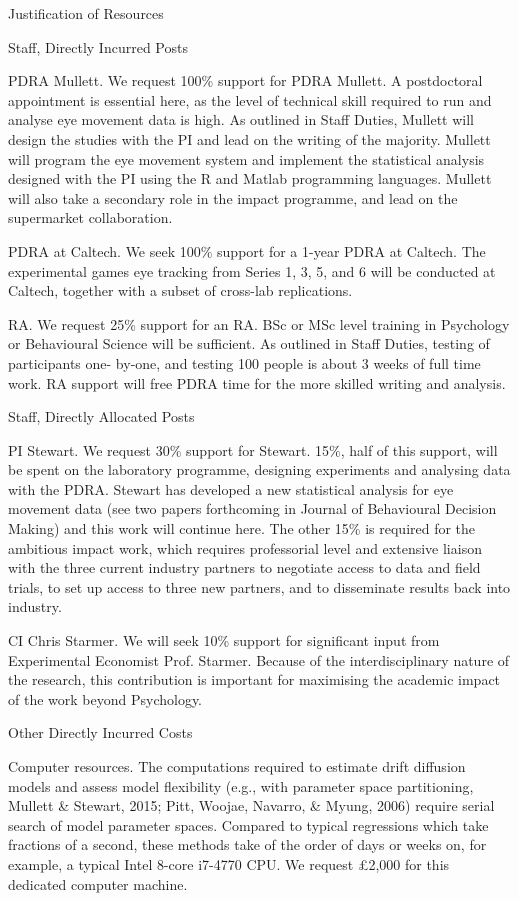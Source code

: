 Justification of Resources

Staff, Directly Incurred Posts

PDRA Mullett. We request 100\% support for PDRA Mullett. A postdoctoral appointment is
essential here, as the level of technical skill required to run and analyse eye movement data is
high. As outlined in Staff Duties, Mullett will design the studies with the PI and lead on the
writing of the majority. Mullett will program the eye movement system and implement the
statistical analysis designed with the PI using the R and Matlab programming languages.
Mullett will also take a secondary role in the impact programme, and lead on the supermarket
collaboration.

PDRA at Caltech. We seek 100\% support for a 1-year PDRA at Caltech. The experimental
games eye tracking from Series 1, 3, 5, and 6 will be conducted at Caltech, together with a
subset of cross-lab replications.

RA. We request 25\% support for an RA. BSc or MSc level training in Psychology or
Behavioural Science will be sufficient. As outlined in Staff Duties, testing of participants one-
by-one, and testing 100 people is about 3 weeks of full time work. RA support will free
PDRA time for the more skilled writing and analysis.

Staff, Directly Allocated Posts

PI Stewart. We request 30\% support for Stewart. 15\%, half of this support, will be spent on
the laboratory programme, designing experiments and analysing data with the PDRA.
Stewart has developed a new statistical analysis for eye movement data (see two papers
forthcoming in Journal of Behavioural Decision Making) and this work will continue here.
The other 15\% is required for the ambitious impact work, which requires professorial level
and extensive liaison with the three current industry partners to negotiate access to data and
field trials, to set up access to three new partners, and to disseminate results back into
industry.

CI Chris Starmer. We will seek 10\% support for significant input from Experimental
Economist Prof. Starmer. Because of the interdisciplinary nature of the research, this
contribution is important for maximising the academic impact of the work beyond
Psychology.


Other Directly Incurred Costs

Computer resources. The computations required to estimate drift diffusion models and assess
model flexibility (e.g., with parameter space partitioning, Mullett & Stewart, 2015; Pitt,
Woojae, Navarro, & Myung, 2006) require serial search of model parameter spaces.
Compared to typical regressions which take fractions of a second, these methods take of the
order of days or weeks on, for example, a typical Intel 8-core i7-4770 CPU. We request
£2,000 for this dedicated computer machine.

